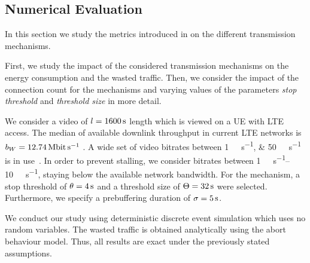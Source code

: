 \subsection{Numerical Evaluation}\label{sec:application:lte_video:numerical_evaluation}

In this section we study the metrics introduced in  on the different transmission mechanisms.

First, we study the impact of the considered transmission mechanisms on the energy consumption and the wasted traffic. 
Then, we consider the impact of the connection count for the \streaming mechanisms and varying values of the parameters \emph{stop threshold} \bufferlower and \emph{threshold size} \buffersize in more detail.

We consider a video of \(l=\SI{1600}{\second}\) length which is viewed on a \gls{UE} with \gls{LTE} access.
The median of available downlink throughput in current \gls{LTE} networks is \(\bandwidth = \SI{12.74}{\mega\bit\per\second}\) \cite{Huang2012}.
A wide set of video bitrates between \SIlist{1;50}{\mega\bit\per\second} is in use~\cite{YouTube2013}.
In order to prevent stalling, we consider bitrates between \SIrange{1}{10}{\mega\bit\per\second}, staying below the available network bandwidth.
For the \streaming mechanism, a stop threshold of \(\theta = \SI{4}{\second}\) and a threshold size of \(\Theta = \SI{32}{\second}\) were selected.
Furthermore, we specify a prebuffering duration of \(\sigma = \SI{5}{\second}\).

We conduct our study using deterministic discrete event simulation which uses no random variables.
The wasted traffic is obtained analytically using the abort behaviour model.
Thus, all results are exact under the previously stated assumptions.

